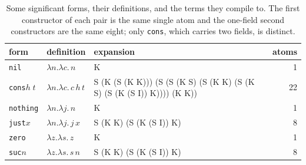 \documentclass[english,submission,code=tt]{programming}
\begin{document}
\begin{table}[htb]
\centering
\caption{Some significant forms, their definitions, and the terms they 
compile to.  The first constructor of each pair is the same single atom 
and the one-field second constructors are the same eight; only
\texttt{cons}, which carries two fields, is distinct.}\label{tab:atoms}
\footnotesize
\begin{tabular}{@{}l l >{\raggedright\arraybackslash\ttfamily}p{3.35in} r@{}}
\toprule
\textrm{form} & \textrm{definition} & \textrm{expansion} & \textrm{atoms} \\
\midrule
\texttt{nil}            & $\lambda n.\lambda c.\,n$       & K & 1 \\
\texttt{cons}\;$h\;t$   & $\lambda n.\lambda c.\,c\,h\,t$ & S (K (S (K K))) (S (S (K S) (S (K K) (S (K S) (S (K (S I)) K)))) (K K)) & 22 \\
\texttt{nothing}        & $\lambda n.\lambda j.\,n$       & K & 1 \\
\texttt{just}\;$x$      & $\lambda n.\lambda j.\,j\,x$    & S (K K) (S (K (S I)) K) & 8 \\
\texttt{zero}           & $\lambda z.\lambda s.\,z$       & K & 1 \\
\texttt{suc}\;$n$       & $\lambda z.\lambda s.\,s\,n$    & S (K K) (S (K (S I)) K) & 8 \\
\bottomrule
\end{tabular}
\end{table}
\end{document}
